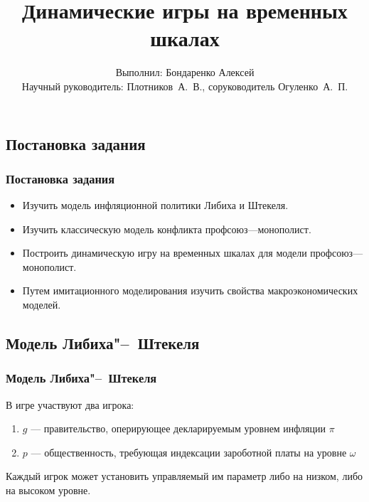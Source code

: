 \documentclass {beamer}
\title{Динамические игры на временных шкалах}
\author {Выполнил: Бондаренко Алексей \\Научный руководитель: Плотников~А.~В., соруководитель Огуленко~А.~П.}
\date{}
\begin{document}
\begin{frame}
\maketitle
\end{frame}

\begin{frame}
\section{Постановка задания}
\frametitle{Постановка задания}
\begin{itemize}
	\item Изучить модель инфляционной политики Либиха и Штекеля. 
	\item Изучить классическую модель конфликта профсоюз---монополист.
	\item Построить динамическую игру на временных шкалах для модели профсоюз---монополист.
	\item Путем имитационного моделирования изучить свойства макроэкономических моделей.
\end{itemize}
\end{frame}

\begin{frame}
\section{Модель Либиха"--~Штекеля}
\frametitle{Модель Либиха"--~Штекеля}
В игре участвуют два игрока: 
\begin{enumerate}
	\item $g$ --- правительство, оперирующее декларируемым уровнем инфляции $\pi$
	\item $p$ --- общественность, требующая индексации зароботной платы на уровне $\omega$
\end{enumerate}

Каждый игрок может установить управляемый им параметр либо на низком, либо на высоком уровне.

\end{frame}
\end{document}
